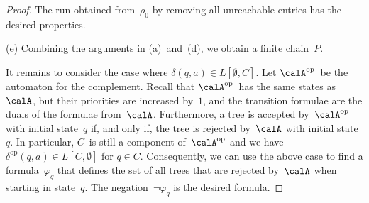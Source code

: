 \documentclass[10pt, fleqn]{scrartcl}
\newcommand*{\op}{\mathrm{op}}
\newcommand*{\?}{\kern .08em}
\begin{document}
\begin{proof}
The run obtained from~$\rho_0$ by removing all unreachable entries has
the desired properties.

(e) Combining the arguments in (a)~and~(d), we obtain a finite chain~$P$.

\smallskip
It remains to consider the case where $\delta(q,a) \in L[\emptyset,C]$.
Let $\calA^\op$~be the automaton for the complement. Recall that
$\calA^\op$~has the same states as~$\calA$, but their priorities are increased by~$1$,
and the transition formulae are the duals of the formulae from~$\calA$.
Furthermore, a tree is accepted by~$\calA^\op$ with initial state~$q$
if, and only if, the tree is rejected by~$\calA$ with initial state~$q$.
In particular, $C$~is still a component of~$\calA^\op$ and we have
$\delta^\op(q,a) \in L[C,\emptyset]$ for $q \in C$.
Consequently, we can use the above case to find a formula~$\varphi_q$ that defines
the set of all trees that are rejected by~$\calA$ when starting in state~$q$.
The negation~$\neg\varphi_q$ is the desired formula.
\end{proof}
\end{document}

